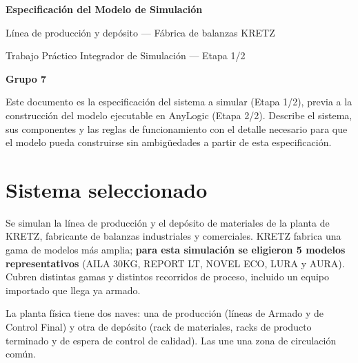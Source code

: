 \documentclass[11pt,a4paper]{article}
\begin{document}
\begin{titlepage}
  \centering
  \vspace*{4cm}
  {\Huge\bfseries\color{kretzazul} Especificación del Modelo de Simulación \par}
  \vspace{0.8cm}
  {\Large Línea de producción y depósito — Fábrica de balanzas KRETZ \par}
  \vspace{1.6cm}
  {\large Trabajo Práctico Integrador de Simulación — Etapa 1/2 \par}
  \vspace{0.3cm}
  {\large\bfseries Grupo 7 \par}
  \vfill
  \begin{minipage}{0.85\linewidth}
    \normalsize Este documento es la especificación del sistema a simular (Etapa 1/2), previa a la construcción del modelo ejecutable en AnyLogic (Etapa 2/2). Describe el sistema, sus componentes y las reglas de funcionamiento con el detalle necesario para que el modelo pueda construirse sin ambigüedades a partir de esta especificación.
  \end{minipage}
  \vspace{2cm}
\end{titlepage}

\tableofcontents
\newpage

\section{Sistema seleccionado}

Se simulan la línea de producción y el depósito de materiales de la planta de KRETZ, fabricante de balanzas industriales y comerciales. KRETZ fabrica una gama de modelos más amplia; \textbf{para esta simulación se eligieron 5 modelos representativos} (AILA 30KG, REPORT LT, NOVEL ECO, LURA y AURA). Cubren distintas gamas y distintos recorridos de proceso, incluido un equipo importado que llega ya armado.

La planta física tiene dos naves: una de producción (líneas de Armado y de Control Final) y otra de depósito (rack de materiales, racks de producto terminado y de espera de control de calidad). Las une una zona de circulación común.
\end{document}
